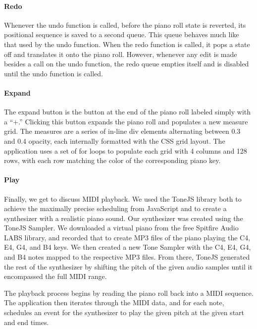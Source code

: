 \paragraph{Redo}

Whenever the undo function is called, before the piano roll state is reverted, its positional
sequence is saved to a second queue. This queue behaves much like that used by the undo function.
When the redo function is called, it pops a state off and translates it onto the piano roll.
However, whenever any edit is made besides a call on the undo function, the redo queue empties
itself and is disabled until the undo function is called.

\paragraph{Expand}

The expand button is the button at the end of the piano roll labeled simply with a “+.” Clicking
this button expands the piano roll and populates a new measure grid. The measures are a series of
in-line div elements alternating between 0.3 and 0.4 opacity, each internally formatted with the
CSS grid layout. The application uses a set of for loops to populate each grid with 4 columns and
128 rows, with each row matching the color of the corresponding piano key.

\paragraph{Play}

Finally, we get to discuss MIDI playback. We used the ToneJS library both to achieve the maximally
precise scheduling from JavaScript and to create a synthesizer with a realistic piano sound.
Our synthesizer was created using the ToneJS Sampler. We downloaded a virtual piano from the free
Spitfire Audio LABS library, and recorded that to create MP3 files of the piano playing the C4, E4,
G4, and B4 keys. We then created a new Tone Sampler with the C4, E4, G4, and B4 notes mapped to the
respective MP3 files. From there, ToneJS generated the rest of the synthesizer by shifting the pitch
of the given audio samples until it encompassed the full MIDI range.

The playback process begins by reading the piano roll back into a MIDI sequence. The application
then iterates through the MIDI data, and for each note, schedules an event for the synthesizer to
play the given pitch at the given start and end times.

